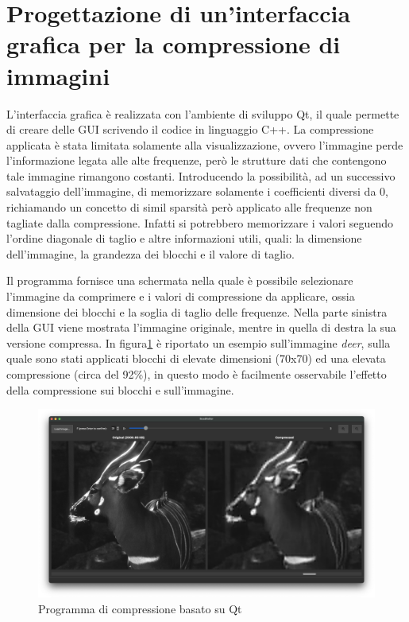 \part{Progettazione di un'interfaccia grafica per la compressione di immagini}

L'interfaccia grafica è realizzata con l'ambiente di sviluppo Qt\cite{qt}, il quale permette di creare delle GUI scrivendo il codice in linguaggio C++. La compressione applicata è stata limitata solamente alla visualizzazione, ovvero l'immagine perde l'informazione legata alle alte frequenze, però le strutture dati che contengono tale immagine rimangono costanti. Introducendo la possibilità, ad un successivo salvataggio dell'immagine, di memorizzare solamente i coefficienti diversi da 0, richiamando un concetto di simil sparsità però applicato alle frequenze non tagliate dalla compressione. Infatti si potrebbero memorizzare i valori seguendo l'ordine diagonale di taglio e altre informazioni utili, quali: la dimensione dell'immagine, la grandezza dei blocchi e il valore di taglio.

Il programma fornisce una schermata nella quale è possibile selezionare l'immagine da comprimere e i valori di compressione da applicare, ossia dimensione dei blocchi e la soglia di taglio delle frequenze. Nella parte sinistra della GUI viene mostrata l'immagine originale, mentre in quella di destra la sua versione compressa. In figura\ref{fig:deer} è riportato un esempio sull'immagine \textit{deer}, sulla quale sono stati applicati blocchi di elevate dimensioni (70x70) ed una elevata compressione (circa del 92\%), in questo modo è facilmente osservabile l'effetto della compressione sui blocchi e sull'immagine.

\begin{figure}[h]
	\centering
	\includegraphics[width=1\linewidth]{figures/qt_deer}
	\caption{Programma di compressione basato su Qt}
	\label{fig:deer}
\end{figure}

